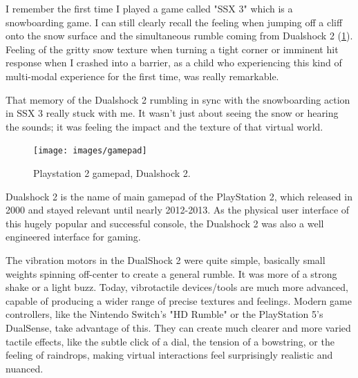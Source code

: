         I remember the first time I played a game called "SSX 3" which is a snowboarding game. I can still clearly recall the feeling when jumping off a cliff onto the snow surface and the simultaneous rumble coming from Dualshock 2 (\ref{fig:DS2}). Feeling of the gritty snow texture when turning a tight corner or imminent hit response when I crashed into a barrier, as a child who experiencing this kind of multi-modal experience for the first time, was really remarkable.\par

        That memory of the Dualshock 2 rumbling in sync with the snowboarding action in SSX 3 really stuck with me. It wasn't just about seeing the snow or hearing the sounds; it was feeling the impact and the texture of that virtual world.

        \begin{figure}[H]
        \centering
        \texttt{[image: images/gamepad]}
        \caption{Playstation 2 gamepad, Dualshock 2.}
        \label{fig:DS2}
        \end{figure}

        Dualshock 2 is the name of main gamepad of the PlayStation 2, which released in 2000 and stayed relevant until nearly 2012-2013. As the physical user interface of this hugely popular and successful console, the Dualshock 2 was also a well engineered interface for gaming.\par

        The vibration motors in the DualShock 2 were quite simple, basically small weights spinning off-center to create a general rumble. It was more of a strong shake or a light buzz\cite{PlayStation_Blogpost}. Today, vibrotactile devices/tools are much more advanced, capable of producing a wider range of precise textures and feelings. Modern game controllers, like the Nintendo Switch's "HD Rumble" or the PlayStation 5's DualSense, take advantage of this. They can create much clearer and more varied tactile effects, like the subtle click of a dial, the tension of a bowstring, or the feeling of raindrops, making virtual interactions feel surprisingly realistic and nuanced.

